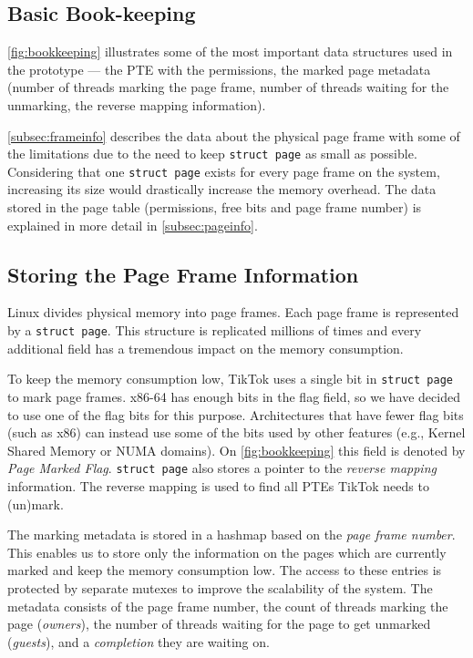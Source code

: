 \documentclass[conference]{IEEEtran}
\newcommand{\sysname}{TikTok}
\begin{document}
\subsection{Basic Book-keeping}
\autoref{fig:bookkeeping} illustrates some of the most important data structures
used in the prototype --- the PTE with the permissions, the marked page metadata
(number of threads marking the page frame, number of threads waiting for the
unmarking, the reverse mapping information). 

\autoref{subsec:frameinfo} describes the data about the physical page frame with
some of the limitations due to the need to keep \texttt{struct page} as small as
possible. Considering that one \texttt{struct page} exists for every page frame
on the system, increasing its size would drastically increase the memory
overhead.  The data stored in the page table (permissions, free bits and page
frame number) is explained in more detail in \autoref{subsec:pageinfo}.

\subsection{Storing the Page Frame Information}
\label{subsec:frameinfo}
Linux divides physical memory into page frames. Each page frame is represented
by a \texttt{struct page}. This structure is replicated millions of times and
every additional field has a tremendous impact on the memory consumption.

To keep the memory consumption low, \sysname{} uses a single bit in \texttt{struct
page} to mark page frames. x86-64 has enough bits in the flag
field, so we have decided to use one of the flag bits for this purpose.
Architectures that have fewer flag bits (such as x86) can instead use some of
the bits used by other features (e.g., Kernel Shared Memory or NUMA domains). On
\autoref{fig:bookkeeping} this field is denoted by \emph{Page Marked Flag}.
\texttt{struct page} also stores a pointer to the \emph{reverse mapping}
information. The reverse mapping is used to find all PTEs \sysname{} needs to
(un)mark.

The marking metadata is stored in a hashmap based on the \emph{page frame
number}. This enables us to store only the information on the pages which are
currently marked and keep the memory consumption low. The access to these entries
is protected by separate mutexes to improve the scalability of the system. The
metadata consists of the page frame number, the count of threads marking the page
(\emph{owners}), the number of threads waiting for the page to get unmarked
(\emph{guests}), and a \emph{completion} they are waiting on. 
\end{document}
